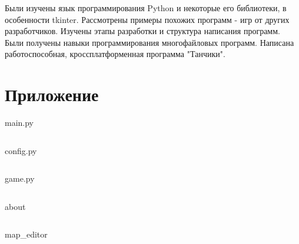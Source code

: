 \documentclass[14pt, oneside]{altsu-report}
\begin{document}
Были изучены язык программирования Python и некоторые его библиотеки, в особенности tkinter. Рассмотрены примеры похожих программ - игр от других разработчиков. Изучены этапы разработки и структура написания программ. Были получены навыки программирования многофайловых программ. Написана работоспособная, кроссплатформенная программа "Танчики".

\nocite{game_dev}
\nocite{game_struct_1}
\nocite{game_struct_2}
\nocite{Python-tkinter_2}
\nocite{python_programming}
\nocite{python_help}
\nocite{basic_tkinter}

\newpage
{}
\printbibliography[title={Список использованных источников}]

\appendix
\newpage
\chapter*{\raggedleft\label{appendix1}Приложение}

\begin{center}
\label{code:appendix}main.py
\end{center}

\begin{code}
\vspace{-1cm}\inputminted{Python}{src/main.py}
\end{code}

\newpage

\begin{center}
\label{code:appendix}config.py
\end{center}

\begin{code}
\vspace{-1cm}\inputminted{Python}{src/config.py}
\end{code}

\begin{center}
\label{code:appendix}game.py
\end{center}

\begin{code}
\vspace{-1cm}\inputminted{Python}{src/game.py}
\end{code}

\begin{center}
\label{code:appendix}about
\end{center}

\begin{code}
\vspace{-1cm}\inputminted{Python}{src/about.py}
\end{code}

\begin{center}
\label{code:appendix}map\_editor
\end{center}

\begin{code}
\vspace{-1cm}\inputminted{Python}{src/map_editor.py}
\end{code}
\end{document}
